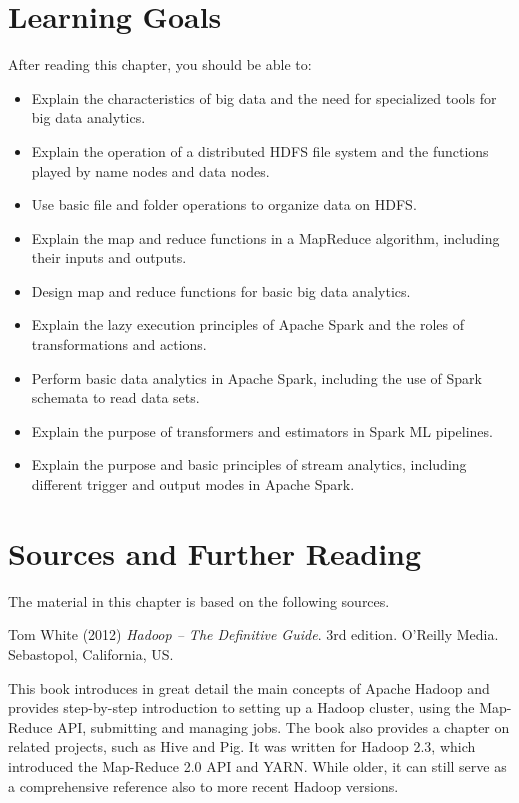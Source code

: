 %
%
\section*{Learning Goals}

After reading this chapter, you should be able to:
\begin{itemize}
    \item Explain the characteristics of big data and the need for specialized tools for big data analytics.
    \item Explain the operation of a distributed HDFS file system and the functions played by name nodes and data nodes. 
    \item Use basic file and folder operations to organize data on HDFS.
    \item Explain the map and reduce functions in a MapReduce algorithm, including their inputs and outputs.
    \item Design map and reduce functions for basic big data analytics. 
    \item Explain the lazy execution principles of Apache Spark and the roles of transformations and actions.
    \item Perform basic data analytics in Apache Spark, including the use of Spark schemata to read data sets.
    \item Explain the purpose of transformers and estimators in Spark ML pipelines.
    \item Explain the purpose and basic principles of stream analytics, including different trigger and output modes in Apache Spark.
\end{itemize}

\section*{Sources and Further Reading}

The material in this chapter is based on the following sources.

\begin{resourcebox}
Tom White (2012) \emph{Hadoop -- The Definitive Guide}. 3rd edition. O'Reilly Media. Sebastopol, California, US.
\end{resourcebox}

This book introduces in great detail the main concepts of Apache Hadoop and provides step-by-step introduction to setting up a Hadoop cluster, using the Map-Reduce API, submitting and managing jobs. The book also provides a chapter on related projects, such as Hive and Pig. It was written for Hadoop 2.3, which introduced the Map-Reduce 2.0 API and YARN. While older, it can still serve as a comprehensive reference also to more recent Hadoop versions.

